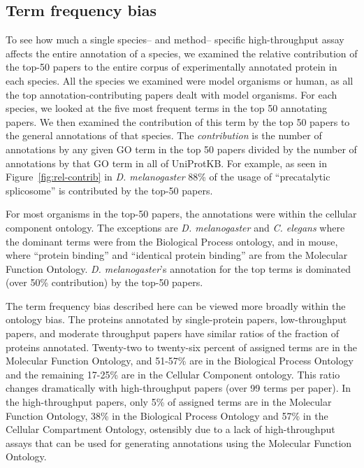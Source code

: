 \documentclass[12pt]{article}
\begin{document}
\subsection*{Term frequency bias}

To see how much a single species-- and method-- specific high-throughput assay affects the entire
annotation of a species, we examined the relative contribution of the top-50 papers to the
entire corpus of experimentally annotated protein in each species.  All the species we
examined were model organisms or human, as all the top annotation-contributing papers dealt with model
organisms. For each species, we looked at the five most frequent terms in the top 50
annotating papers. We then examined the contribution of this term by the top 50 papers to the
general annotations of that species.  The \textit{contribution} is the number of annotations
by any given GO term in the top 50 papers divided by the number of annotations by that GO
term in all of UniProtKB.  For example, as seen in Figure~\ref{fig:rel-contrib} in \textit{D.
melanogaster} 88\% of the usage of ``precatalytic splicosome'' is contributed by the top-50
papers. 


For most organisms in the top-50 papers,  the annotations were within the cellular component
ontology. The exceptions are \textit{D. melanogaster} and \textit{C. elegans} where the
dominant terms were from the Biological Process ontology, and in mouse, where ``protein
binding'' and ``identical protein binding'' are from the Molecular Function Ontology.
\textit{D. melanogaster}'s annotation for the top terms is dominated (over 50\% contribution)
by the top-50 papers. 

The term frequency bias described here can be viewed more broadly within the ontology bias. The proteins
annotated by single-protein papers, low-throughput papers, and moderate throughput papers 
have similar ratios of the fraction of proteins annotated.  Twenty-two to twenty-six percent of assigned
terms are in the Molecular Function Ontology, and 51-57\% are in the Biological Process Ontology and the
remaining 17-25\% are in the Cellular Component ontology. This ratio changes dramatically with
high-throughput papers (over 99 terms per paper). In the high-throughput papers, only 5\% of assigned
terms are in the Molecular Function Ontology, 38\% in the Biological Process Ontology and 57\% in the
Cellular Compartment Ontology, ostensibly due to a lack of high-throughput assays that can be used for
generating annotations using the Molecular Function Ontology. 
\end{document}
